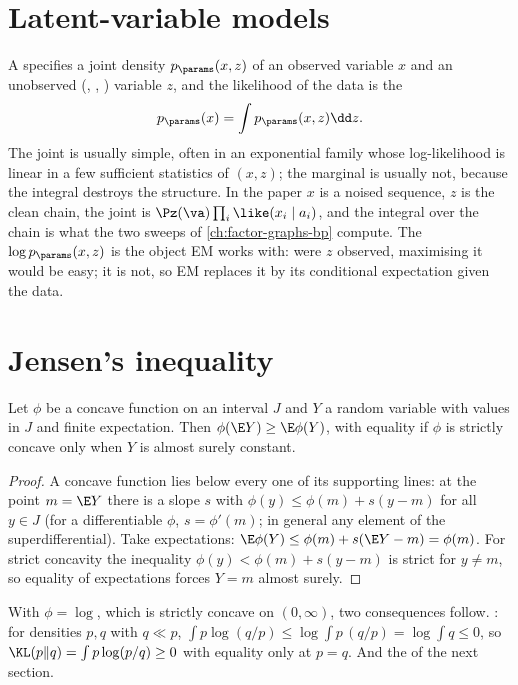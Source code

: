 \section{Latent-variable models}

A  specifies a joint density $p_\params(x,z)$ of an observed
variable $x$ and an unobserved (, , ) variable
$z$, and the likelihood of the data is the 
\begin{equation}
  p_\params(x)=\int p_\params(x,z)\dd z.
  \label{eq:ml-marginal}
\end{equation}
The joint is usually simple, often in an exponential family whose log-likelihood is
linear in a few sufficient statistics of $(x,z)$; the marginal is usually not, because
the integral destroys the structure. In the paper $x$ is a noised sequence, $z$ is the
clean chain, the joint is $\Pz(\va)\prod_i\like(x_i\mid a_i)$, and the integral over the
chain is what the two sweeps of \cref{ch:factor-graphs-bp} compute. The
 $\log p_\params(x,z)$ is the object EM works with:
were $z$ observed, maximising it would be easy; it is not, so EM replaces it by its
conditional expectation given the data.

\section{Jensen's inequality}

\begin{lemma}[Jensen]
\label{lem:ml-jensen}
Let $\phi$ be a concave function on an interval $J$ and $Y$ a random variable with
values in $J$ and finite expectation. Then $\phi(\E Y)\ge\E\phi(Y)$, with equality if
$\phi$ is strictly concave only when $Y$ is almost surely constant.
\end{lemma}
\begin{proof}
A concave function lies below every one of its supporting lines: at the point
$m=\E Y$ there is a slope $s$ with $\phi(y)\le\phi(m)+s(y-m)$ for all $y\in J$ (for a
differentiable $\phi$, $s=\phi'(m)$; in general any element of the superdifferential).
Take expectations: $\E\phi(Y)\le\phi(m)+s(\E Y-m)=\phi(m)$. For strict concavity the
inequality $\phi(y)<\phi(m)+s(y-m)$ is strict for $y\ne m$, so equality of expectations
forces $Y=m$ almost surely.
\end{proof}

With $\phi=\log$, which is strictly concave on $(0,\infty)$, two consequences follow.
: for densities $p,q$ with $q\ll p$,
$\int p\log(q/p)\le\log\int p\,(q/p)=\log\int q\le0$, so $\KL(p\|q)=\int p\log(p/q)\ge0$
with equality only at $p=q$. And the  of the next section.

